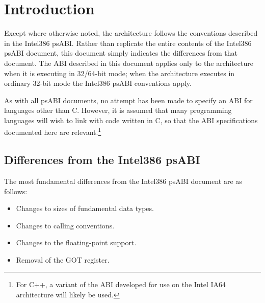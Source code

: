 \chapter{Introduction}

Except where otherwise noted, the \xARCH architecture follows the
conventions described in the Intel386 psABI.  Rather than replicate
the entire contents of the Intel386 psABI document, this document
simply indicates the differences from that document.  The ABI
described in this document applies only to the \xARCH architecture
when it is executing in 32/64-bit mode; when the architecture executes
in ordinary 32-bit mode the Intel386 psABI conventions apply.

As with all psABI documents, no attempt has been made to specify an
ABI for languages other than C.  However, it is assumed that many
programming languages will wish to link with code written in C, so
that the ABI specifications documented here are relevant.\footnote{For
  C++, a variant of the ABI developed for use on the Intel IA64
  architecture will likely be used.}

\section{Differences from the Intel386 psABI}

The most fundamental differences from the Intel386 psABI document
are as follows:
\begin{itemize}
\item Changes to sizes of fundamental data types.
\item Changes to calling conventions.
\item Changes to the floating-point support.
\item Removal of the GOT register.
\end{itemize}

